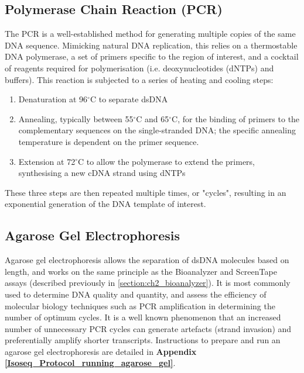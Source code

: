 \subsection{Polymerase Chain Reaction (PCR)}
\label{section:ch2_PCR_explanation} 
The PCR is a well-established method for generating multiple copies of the same DNA sequence. Mimicking natural DNA replication, this relies on a thermostable DNA polymerase, a set of primers specific to the region of interest, and a cocktail of reagents required for polymerisation (i.e. deoxynucleotides (dNTPs) and buffers). This reaction is subjected to a series of heating and cooling steps: 
\begin{enumerate}
	\item Denaturation at 96$^{\circ}$C to separate dsDNA 
	\item Annealing, typically between 55$^{\circ}$C  and 65$^{\circ}$C, for the binding of primers to the complementary sequences on the single-stranded DNA; the specific annealing temperature is dependent on the primer sequence. 
	\item Extension at 72$^{\circ}$C to allow the polymerase to extend the primers, synthesising a new cDNA strand using dNTPs
\end{enumerate} 
These three steps are then repeated multiple times, or "cycles", resulting in an exponential generation of the DNA template of interest.

\subsection{Agarose Gel Electrophoresis}
\label{section:ch2_agarose_explanation}  
Agarose gel electrophoresis allows the separation of dsDNA molecules based on length, and works on the same principle as the Bioanalyzer and ScreenTape assays (described previously in \cref{section:ch2_bioanalyzer}). It is most commonly used to determine DNA quality and quantity, and assess the efficiency of molecular biology techniques such as PCR amplification in determining the number of optimum cycles. It is a well known phenomenon that an increased number of unnecessary PCR cycles can generate artefacts (strand invasion) and preferentially amplify shorter transcripts\cite{Acinas2005,Bayega2018}. Instructions to prepare and run an agarose gel electrophoresis are detailed in \textbf{Appendix \ref{Isoseq_Protocol_running_agarose_gel}}.


